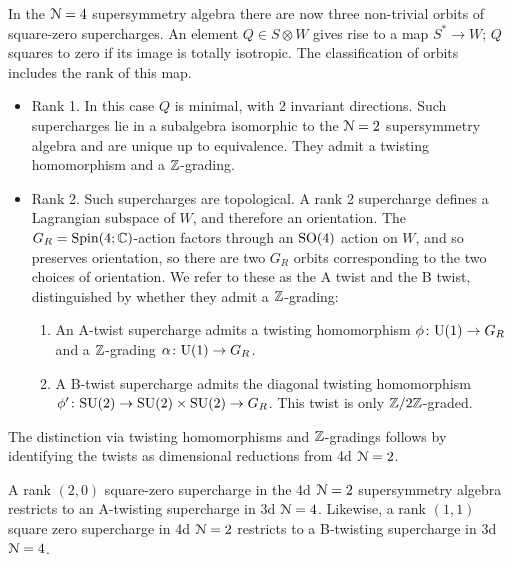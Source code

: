 \documentclass[10pt, oneside]{article}
\begin{document}
In the $\mathcal{N}=4$ supersymmetry algebra there are now three non-trivial orbits of square-zero supercharges.  An element $Q \in S \otimes W$ gives rise to a map $S^* \to W$; $Q$ squares to zero if its image is totally isotropic.  The classification of orbits includes the rank of this map.
\begin{itemize}
 \item Rank 1.  
 In this case $Q$ is minimal, with 2 invariant directions.  
 Such supercharges lie in a subalgebra isomorphic to the $\mathcal{N}=2$ supersymmetry algebra and are unique up to equivalence. They admit a twisting homomorphism and a $\mathbb Z$-grading.
 \item Rank 2. Such supercharges are topological.  
A rank 2 supercharge defines a Lagrangian subspace of $W$, and therefore an orientation.  
The $G_R = \mathrm{Spin}(4;\mathbb C)$-action factors through an $\mathrm{SO}(4)$ action on $W$, and so preserves orientation, so there are two $G_R$ orbits corresponding to the two choices of orientation. We refer to these as the A twist and the B twist, distinguished by whether they admit a $\mathbb Z$-grading:
\begin{enumerate}
\item
An A-twist supercharge admits a twisting homomorphism $\phi \colon \mathrm{U}(1) \to G_R$ and a $\mathbb Z$-grading $\alpha \colon \mathrm{U}(1) \to G_R$.
\item
A B-twist supercharge admits the diagonal twisting homomorphism $\phi' \colon \mathrm{SU}(2) \to \mathrm{SU}(2) \times \mathrm{SU}(2) \to G_R$.  
This twist is only $\mathbb Z/2\mathbb Z$-graded.
\end{enumerate}
\end{itemize}

The distinction via twisting homomorphisms and $\mathbb Z$-gradings follows by identifying the twists as dimensional reductions from 4d $\mathcal{N}=2$.
 
\begin{lemma} \label{3d_4_orbits_lemma}
A rank $(2,0)$ square-zero supercharge in the 4d $\mathcal{N}=2$ supersymmetry algebra restricts to an A-twisting supercharge in 3d $\mathcal{N}=4$.  Likewise, a rank $(1,1)$ square zero supercharge in 4d $\mathcal{N}=2$ restricts to a B-twisting supercharge in 3d $\mathcal{N}=4$.
\end{lemma}
\end{document}
